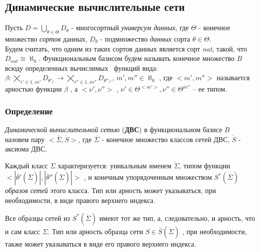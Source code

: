   \subsection{Динамические вычислительные сети}
	Пусть 
	$ D = \displaystyle\bigcup_{\theta\in\Theta} D_\theta $  - многосортный \textit{универсум данных},  
	где $\Theta$ - конечное множество \textit{сортов} данных, 
	$D_\theta$ - подмножество \textit{данных} сорта $\theta\in\Theta$.\\
	Будем считать, что одним из таких сортов данных является сорт \textit{nat}, такой, что $D_{\textit{nat}} \cong \aleph_0$.
	Функциональным базисом будем называть конечное множество  $ B $   всюду определенных вычислимых~\cite{falkTheory} функций вида:\\
	$ \beta: \displaystyle\bigtimes_{i'\in 1..m'}D_{\theta'_{i'}} \rightarrow \displaystyle\bigtimes_{i''\in 1..m''}D_{\theta''_{i''}} $, $ m',m'' \in \aleph_0 $  , 
	где  $ <m',m''> $   называется арностью функции $ \beta $  , а  $ <\nu',\nu''> $  , $ \nu'\in \Theta^{<m'>}, \nu''\in \Theta^{m''}  $ -- ее типом.
	\subsubsection{Определение}
		\textit{ Динамической вычислительной сетью} (\textbf{ДВС}) в функциональном базисе $B$ 
		назовем пару $<\bar{\Sigma},\dot{S}>$, где $\overline{\Sigma}$ 
		- конечное множество классов сетей ДВС, $\dot{S}$ - аксиома ДВС.
		 
		Каждый класс $\Sigma$ характеризуется: 
		уникальным именем  $\dot{\Sigma}$, 
		типом функции 
		$< |\bar{\theta}'(\dot{\Sigma})|,|\bar{\theta}''(\dot{\Sigma})|>$
		,  и конечным упорядоченным множеством $S^*(\dot{\Sigma})$
		\textit{образов сетей} этого класса.
		Тип или арность может указываться,
		при необходимости, в виде правого верхнего индекса.
		 
		Все образцы сетей из $S^*(\dot{\Sigma})$ имеют тот же тип, а, следовательно,
		и арность, что и сам класс $\Sigma$.
		Тип или арность образца сети   $S\in\bar{S}(\dot{\Sigma})$ ,
		при необходимости, также может указываться в виде его правого верхнего индекса.
		 
